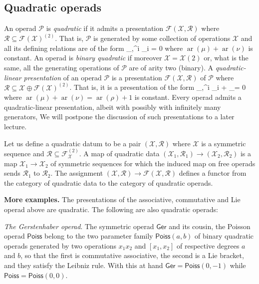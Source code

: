 \documentclass[fleqn, a4paper, twoside]{article}
\makeatletter
\newcommand{\0}{\langle 0\rangle}
\newcommand{\XX}{\mathcal{X}}
\newcommand{\RR}{\mathcal{R}}
\newcommand{\FF}{\mathcal{F}}
\newcommand{\ari}{\operatorname{ar}}
\let\[\@undefined
\DeclareRobustCommand{\[}{\begin{equation}}%
\let\]\@undefined
\DeclareRobustCommand{\]}{\end{equation}}%
\theoremstyle{mytheorem}
\theoremstyle{introthm}
\theoremstyle{mydefinition}
\theoremstyle{mydefinition2}
\theoremstyle{plain} %
\newcommand{\?}{\,?\,}
\newcommand{\PP}{{\mathcal{P}}}
\theoremstyle{mytheorem}
\theoremstyle{plain} %
\makeatother
\begin{document}
\subsection{Quadratic operads}
An operad $\PP$ is \emph{quadratic} if it admits a presentation
$\FF(\XX,\RR)$ where $\RR \subseteq \FF(\XX)^{(2)}$. 
That is, $\PP$ is generated by some collection of
operations $\XX$ and all its defining relations are of the form
\[ \sum \lambda_{\mu,\nu}^i \mu \circ_i \nu = 0  \] 
where $\ari(\mu)+\ari(\nu)$ is constant. An operad is
\emph{binary quadratic} if moreover $\XX = \XX(2)$ or,
what is the same, all the generating operations of $\PP$
are of arity two (binary). 
 A \emph{quadratic-linear presentation} of an operad $\PP$
is a presentation $\FF(\XX,\RR)$ of $\PP$ where $\RR 
\subseteq \XX \oplus \FF(\XX)^{(2)}$. That is, it is
a presentation of the form
\[ \sum \lambda_{\mu,\nu}^i \mu \circ_i \nu 
 + \sum \lambda_\rho \rho = 0   \] 
 where $\ari(\mu)+\ari(\nu) = \ari(\rho)+1$ is constant.
 Every operad admits a quadratic-linear
presentation, albeit with possibly with infinitely many generators, 
We will postpone the discussion of such presentations
to a later lecture.
 
 Let us define a quadratic datum to be a pair $(\XX,\RR)$
 where $\XX$ is a symmetric sequence and $\RR\subseteq
 \FF_\XX^{(2)}$. A map of quadratic data $(\XX_1,\RR_1) 
 \longrightarrow (\XX_2,\RR_2)$ is a map $\XX_1
 \to \XX_2$ of symmetric sequences for which the induced
 map on free operads sends $\RR_1$ to $\RR_2$. The 
 assignment $(\XX,\RR) \longrightarrow \FF(\XX,\RR)$
 defines a functor from the category of quadratic data
 to the category of quadratic operads.
 
 \bigskip
 
\textbf{More examples.} The presentations of the 
associative, commutative and Lie operad above are
quadratic. The following are also quadratic operads:

\emph{The Gerstenhaber operad}. The symmetric operad
$\mathsf{Ger}$ and its cousin,
the Poisson operad $\mathsf{Poiss}$ belong to the two parameter
family $\mathsf{Poiss}(a,b)$ of binary quadratic operads generated
by two operations $x_1x_2$ and $[x_1,x_2]$ of respective degrees
$a$ and $b$, so that
the first is commutative associative, the second is a Lie
bracket, and they satisfy the Leibniz rule. With this
at hand $\mathsf{Ger} =\mathsf{Poiss}(0,-1)$ while  
$\mathsf{Poiss} = \mathsf{Poiss}(0,0)$.

\smallskip
\end{document}
